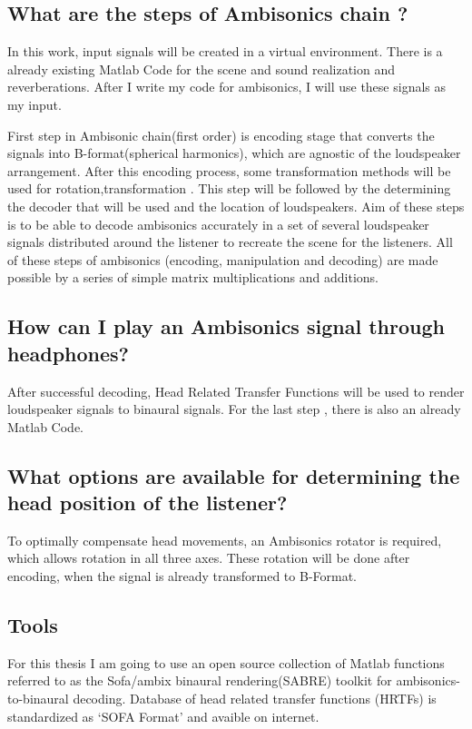\documentclass[lang=ngerman,inputenc=utf8,fontsize=10pt]{ldvarticle}
\begin{document}
\subsection{What are the steps of Ambisonics chain ?}

In this work, input signals will be created in a virtual environment. There is a already existing  Matlab Code for the scene and sound realization and reverberations.  After I write my code for ambisonics, I will use these signals as my input.

First step in Ambisonic chain(first order) is encoding stage that converts the signals into B-format(spherical harmonics), which are agnostic of the loudspeaker arrangement. After this encoding process, some transformation methods will be used for rotation,transformation . This step will be followed by the determining the decoder that will be used and  the location of loudspeakers. Aim of these steps is to be able to decode ambisonics accurately in a set of several loudspeaker signals distributed around the listener to recreate the scene for the listeners. 
All of these steps of ambisonics (encoding, manipulation and decoding) are made possible by a series of simple matrix multiplications and additions.


\subsection{How can I play an Ambisonics signal through headphones?}

After successful decoding, Head Related Transfer Functions will be used to render loudspeaker signals to binaural signals. For the last step , there is also an already Matlab Code.

\subsection{What options are available for determining the head position of the listener?}

To optimally compensate head movements, an Ambisonics rotator is required, which allows rotation in all three axes. These rotation will be done after encoding, when the signal is already transformed to B-Format. 

\subsection{Tools}
For this thesis I am going to use an open source collection of Matlab functions referred to as the Sofa/ambix binaural rendering(SABRE) toolkit for ambisonics-to-binaural decoding. Database of head related transfer functions (HRTFs) is standardized as ‘SOFA Format’ and avaible  on internet.
\end{document}
